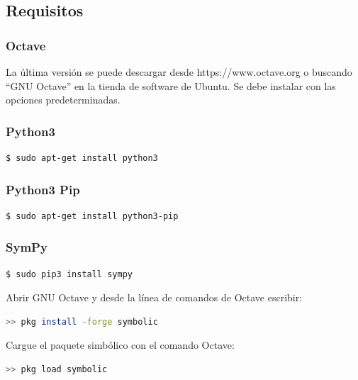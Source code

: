 \documentclass[12pt]{article}
\begin{document}
\subsection{Requisitos}

\subsubsection{Octave}\label{ins-octave}
La última versión se puede descargar desde https://www.octave.org o buscando “GNU Octave” en la tienda de software de Ubuntu. Se debe instalar con las opciones predeterminadas.

\subsubsection{Python3}
\begin{lstlisting}[language=bash]
  $ sudo apt-get install python3
\end{lstlisting}
\subsubsection{Python3 Pip}
\begin{lstlisting}[language=bash]
  $ sudo apt-get install python3-pip
\end{lstlisting}

\subsubsection{SymPy}
\begin{lstlisting}[language=bash]
  $ sudo pip3 install sympy
\end{lstlisting}
Abrir GNU Octave y desde la línea de comandos de Octave escribir:
\begin{lstlisting}[language=bash]
  >> pkg install -forge symbolic
\end{lstlisting}
Cargue el paquete simbólico con el comando Octave:
\begin{lstlisting}[language=bash]
  >> pkg load symbolic
\end{lstlisting}

\pagebreak
\end{document}

